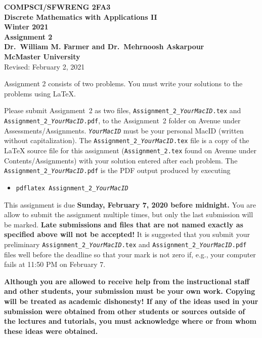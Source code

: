 \documentclass[11pt,fleqn]{article}
\begin{document}
\begin{center}

  {\large \textbf{COMPSCI/SFWRENG 2FA3}}\\[2mm]
  {\large \textbf{Discrete Mathematics with Applications II}}\\[2mm]
  {\large \textbf{Winter 2021}}\\[8mm]
  {\huge \textbf{Assignment 2}}\\[6mm]
  {\large \textbf{Dr.~William M. Farmer and Dr.~Mehrnoosh Askarpour}}\\[2mm]
  {\large \textbf{McMaster University}}\\[6mm]
  {\large Revised: February 2, 2021}

\end{center}

\medskip

Assignment 2 consists of two problems.  You must write your solutions
to the problems using LaTeX.

Please submit Assignment~2 as two files,
\texttt{Assignment\_2\_\emph{YourMacID}.tex} and
\texttt{Assignment\_2\_\emph{YourMacID}.pdf}, to the Assignment~2
folder on Avenue under Assessments/Assignments.
\texttt{\emph{YourMacID}} must be your personal MacID (written without
capitalization).  The \texttt{Assignment\_2\_\emph{YourMacID}.tex}
file is a copy of the LaTeX source file for this assignment
(\texttt{Assignment\_2.tex} found on Avenue under
Contents/Assignments) with your solution entered after each problem.
The \texttt{Assignment\_2\_\emph{YourMacID}.pdf} is the PDF output
produced by executing

\begin{itemize}

  \item[] \texttt{pdflatex Assignment\_2\_\emph{YourMacID}}

\end{itemize}

This assignment is due \textbf{Sunday, February 7, 2020 before
  midnight.}  You are allow to submit the assignment multiple times,
but only the last submission will be marked.  \textbf{Late submissions
  and files that are not named exactly as specified above will not be
  accepted!}  It is suggested that you submit your preliminary
\texttt{Assignment\_2\_\emph{YourMacID}.tex} and
\texttt{Assignment\_2\_\emph{YourMacID}.pdf} files well before the
deadline so that your mark is not zero if, e.g., your computer fails
at 11:50 PM on February 7.

\textbf{Although you are allowed to receive help from the
  instructional staff and other students, your submission must be your
  own work.  Copying will be treated as academic dishonesty! If any of
  the ideas used in your submission were obtained from other students
  or sources outside of the lectures and tutorials, you must
  acknowledge where or from whom these ideas were obtained.}
\end{document}
